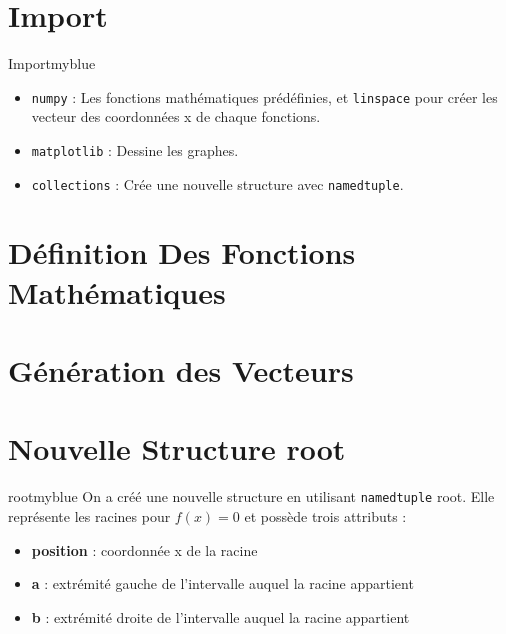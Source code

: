 
\setcounter{section}{0}

\vspace{0.25cm}


\section{Import}
\begin{prettyBox}{Import}{myblue}
\begin{itemize}
    \item \texttt{numpy} : Les fonctions mathématiques prédéfinies, et \texttt{linspace} pour créer  
        les vecteur des coordonnées x de chaque fonctions.  
    \item \texttt{matplotlib} : Dessine les graphes.  
    \item \texttt{collections} : Crée une nouvelle structure avec \texttt{namedtuple}.  
\end{itemize}
\end{prettyBox}
\vspace{0.5cm}


\vspace{1cm}

\section{Définition Des Fonctions Mathématiques}


\vspace{1cm}
\section{Génération des Vecteurs}


\newpage
\section{Nouvelle Structure root}
\begin{prettyBox}{root}{myblue}
On a créé une nouvelle structure en utilisant \texttt{namedtuple} root. Elle représente 
les racines pour \( f(x) = 0 \) et possède trois attributs :
\begin{itemize}
    \item \textbf{position} : coordonnée x de la racine
    \item \textbf{a} : extrémité gauche de l'intervalle auquel la racine appartient
    \item \textbf{b} : extrémité droite de l'intervalle auquel la racine appartient
\end{itemize}
\end{prettyBox}
\vspace{0.5cm}


